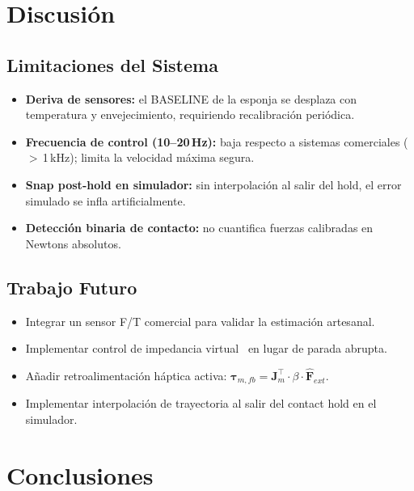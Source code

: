 \documentclass[journal,10pt,twoside]{IEEEtran}
\begin{document}
\section{Discusión}
\label{sec:disc}

\subsection{Limitaciones del Sistema}
\begin{itemize}[leftmargin=1.2em,itemsep=2pt]
  \item \textbf{Deriva de sensores:} el BASELINE de la esponja
        se desplaza con temperatura y envejecimiento, requiriendo
        recalibración periódica.
  \item \textbf{Frecuencia de control (10--20\,Hz):} baja respecto
        a sistemas comerciales ($>$\,1\,kHz); limita la velocidad
        máxima segura.
  \item \textbf{Snap post-hold en simulador:} sin interpolación
        al salir del hold, el error simulado se infla artificialmente.
  \item \textbf{Detección binaria de contacto:} no cuantifica
        fuerzas calibradas en Newtons absolutos.
\end{itemize}

\subsection{Trabajo Futuro}
\begin{itemize}[leftmargin=1.2em,itemsep=2pt]
  \item Integrar un sensor F/T comercial para validar la
        estimación artesanal.
  \item Implementar control de impedancia virtual~\cite{hogan1985}
        en lugar de parada abrupta.
  \item Añadir retroalimentación háptica activa:
        $\bm{\tau}_{m,fb}=\bm{J}_m^\top\cdot\beta\cdot\hat{\bm{F}}_{ext}$.
  \item Implementar interpolación de trayectoria al salir del
        contact hold en el simulador.
\end{itemize}

\section{Conclusiones}
\label{sec:conc}
\end{document}
